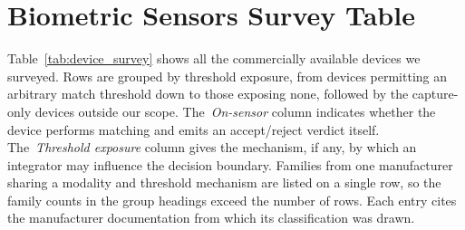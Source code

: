 \documentclass[conference,compsoc]{IEEEtran}
\begin{document}
\section{Biometric Sensors Survey Table}\label{app:Bio_table}
\noindent
Table~\ref{tab:device_survey} shows all the commercially available devices we surveyed. Rows are grouped by threshold exposure, from devices permitting an arbitrary match threshold down to those exposing none, followed by the capture-only devices outside our scope. The~\emph{On-sensor} column indicates whether the device performs matching and emits an accept/reject verdict itself. The~\emph{Threshold exposure} column gives the mechanism, if any, by which an integrator may influence the decision boundary. Families from one manufacturer sharing a modality and threshold mechanism are listed on a single row, so the family counts in the group headings exceed the number of rows. Each entry cites the manufacturer documentation from which its classification was drawn.
\end{document}
